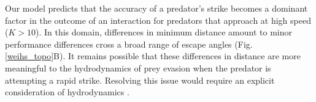 \documentclass[12pt]{article}
\begin{document}
Our model predicts that the accuracy of a predator's strike becomes a dominant factor in the outcome of an interaction for predators that approach at high speed ($K>10$).  In this domain, differences in minimum distance amount to minor performance differences cross a broad range of escape angles (Fig. \ref{weihs_topo}B). It remains possible that these differences in distance are more meaningful to the hydrodynamics of prey evasion when the predator is attempting a rapid strike. Resolving this issue would require an explicit consideration of hydrodynamics \citep[as in][]{Holzman:2011fq}.




\pagebreak



\end{document}
